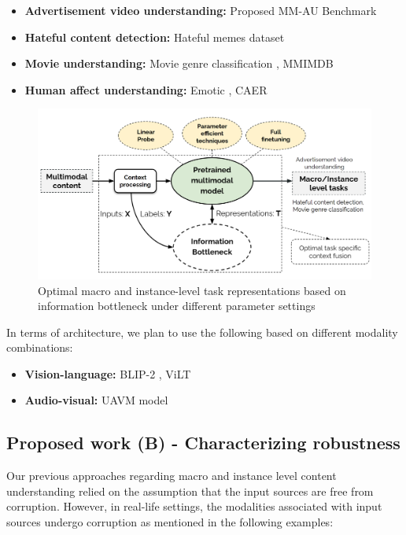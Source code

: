 \begin{itemize}
    \item \textbf{Advertisement video understanding:} Proposed MM-AU Benchmark
    \item \textbf{Hateful content detection:} Hateful memes \cite{Kiela2020TheHM} dataset
    \item \textbf{Movie understanding:}  Movie genre classification \cite{2019Moviescope}, MMIMDB \cite{Arevalo2017GatedMU}
    \item \textbf {Human affect understanding:} Emotic \cite{kostiPAMI}, CAER \cite{CAER-S}
\end{itemize}
\begin{figure}
 \centering 
 \includegraphics[width=\textwidth]{figures/optimal_task_representations.png}
 \caption{Optimal macro and instance-level task representations based on information bottleneck under different parameter settings}
 \label{optimal_task_representations}
\end{figure}

In terms of architecture, we plan to use the following based on different modality combinations:
\begin{itemize}
\item \textbf{Vision-language:} BLIP-2 \cite{Li2023BLIP2BL}, ViLT \cite{Kim2021ViLTVT}
\item \textbf{Audio-visual:} UAVM model \cite{uavm_gong}
\end{itemize}


\subsection{Proposed work (B) - Characterizing robustness}

Our previous approaches regarding macro and instance level content understanding relied on the assumption that the input sources are free from corruption. However, in real-life settings, the modalities associated with input sources undergo corruption as mentioned in the following examples:

